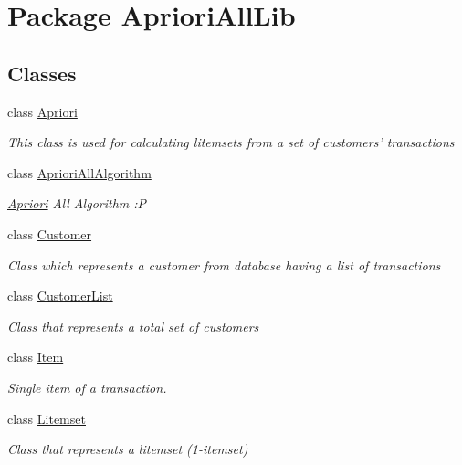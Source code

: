 \hypertarget{namespace_apriori_all_lib}{\section{Package Apriori\-All\-Lib}
\label{namespace_apriori_all_lib}
}
\subsection*{Classes}
\begin{DoxyCompactItemize}
\item 
class \hyperlink{class_apriori_all_lib_1_1_apriori}{Apriori}
\begin{DoxyCompactList}\small\item\em This class is used for calculating litemsets from a set of customers' transactions \end{DoxyCompactList}\item 
class \hyperlink{class_apriori_all_lib_1_1_apriori_all_algorithm}{Apriori\-All\-Algorithm}
\begin{DoxyCompactList}\small\item\em \hyperlink{class_apriori_all_lib_1_1_apriori}{Apriori} All Algorithm \-:P \end{DoxyCompactList}\item 
class \hyperlink{class_apriori_all_lib_1_1_customer}{Customer}
\begin{DoxyCompactList}\small\item\em Class which represents a customer from database having a list of transactions \end{DoxyCompactList}\item 
class \hyperlink{class_apriori_all_lib_1_1_customer_list}{Customer\-List}
\begin{DoxyCompactList}\small\item\em Class that represents a total set of customers \end{DoxyCompactList}\item 
class \hyperlink{class_apriori_all_lib_1_1_item}{Item}
\begin{DoxyCompactList}\small\item\em Single item of a transaction. \end{DoxyCompactList}\item 
class \hyperlink{class_apriori_all_lib_1_1_litemset}{Litemset}
\begin{DoxyCompactList}\small\item\em Class that represents a litemset (1-\/itemset) \end{DoxyCompactList}\item 

\end{DoxyCompactItemize}
